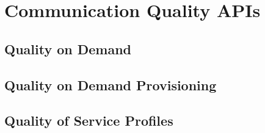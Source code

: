 
\section{Communication Quality APIs}
\subsection{Quality on Demand}
\subsection{Quality on Demand Provisioning}
\subsection{Quality of Service Profiles}
